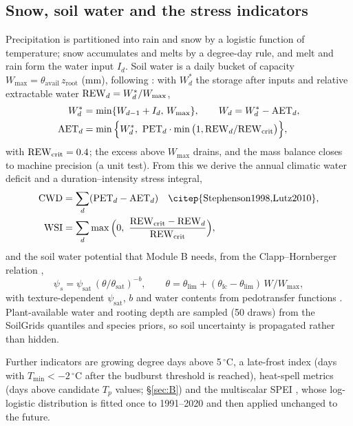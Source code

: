 \subsection{Snow, soil water and the stress indicators}
Precipitation is partitioned into rain and snow by a logistic function of temperature; snow accumulates and melts by a degree-day rule, and melt and rain form the water input $I_d$. Soil water is a daily bucket of capacity $W_{\max}=\theta_{\text{avail}}\,z_{\text{root}}$ (mm), following \citet{Granier1999}: with $W^\ast_d$ the storage after inputs and relative extractable water $\mathrm{REW}_d=W^\ast_d/W_{\max}$,
\begin{equation}\label{eq:bucket}
\begin{aligned}
W^\ast_d&=\min\{W_{d-1}+I_d,\,W_{\max}\},\qquad W_d=W^\ast_d-\mathrm{AET}_d,\\
\mathrm{AET}_d&=\min\Big\{W^\ast_d,\ \mathrm{PET}_d\cdot\min\big(1,\REW_d/\REW_{\text{crit}}\big)\Big\},
\end{aligned}
\end{equation}
with $\mathrm{REW}_{\text{crit}}=0.4$; the excess above $W_{\max}$ drains, and the mass balance closes to machine precision (a unit test). From this we derive the annual climatic water deficit and a duration--intensity stress integral,
\begin{equation}\label{eq:cwd}
\begin{aligned}
\CWD&=\sum_d(\mathrm{PET}_d-\mathrm{AET}_d)\quad\text{\citep{Stephenson1998,Lutz2010}},\\
\WSI&=\sum_d\max\Big(0,\ \frac{\REW_{\text{crit}}-\REW_d}{\REW_{\text{crit}}}\Big),
\end{aligned}
\end{equation}
and the soil water potential that Module B needs, from the Clapp--Hornberger relation \citep{Clapp1978},
\begin{equation}\label{eq:psi}
\psi_s=\psi_{\text{sat}}\,(\theta/\theta_{\text{sat}})^{-b},\qquad \theta=\theta_{\text{lim}}+(\theta_{\text{fc}}-\theta_{\text{lim}})\,W/W_{\max},
\end{equation}
with texture-dependent $\psi_{\text{sat}}$, $b$ and water contents from pedotransfer functions \citep{Saxton2006}. Plant-available water and rooting depth are sampled (50 draws) from the SoilGrids quantiles and species priors, so soil uncertainty is propagated rather than hidden.

Further indicators are growing degree days above 5\,$^\circ$C, a late-frost index (days with $T_{\min}<-2\,^\circ$C after the budburst threshold is reached), heat-spell metrics (days above candidate $T_p$ values; \S\ref{sec:B}) and the multiscalar SPEI \citep{VicenteSerrano2010,Begueria2014}, whose log-logistic distribution is fitted once to 1991--2020 and then applied unchanged to the future.

